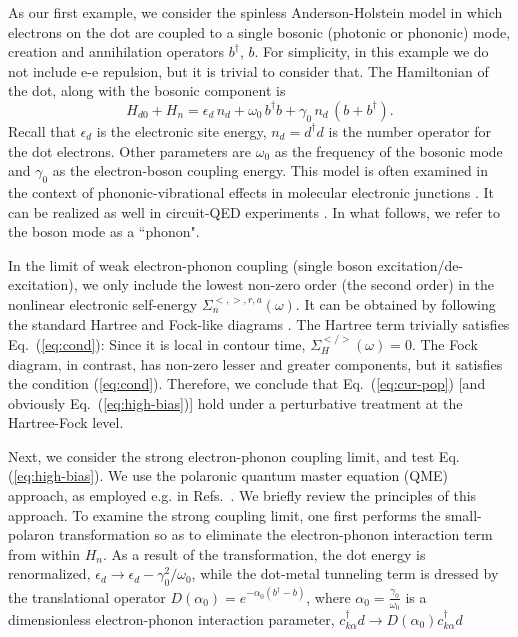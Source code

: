 \documentclass[aps,pra,twocolumn,groupedaddress,showpacs,superscriptaddress,amssymb,amsmath]{revtex4-1}
\newcommand{\be}{\begin{equation}}
\newcommand{\ee}{\end{equation}}
\begin{document}


As our first example, we consider the spinless Anderson-Holstein model \cite{AHcomment}
in which electrons on  the dot are coupled 
to a single bosonic (photonic or phononic) mode, creation and annihilation operators $b^{\dagger}$, $b$.
For simplicity, in this example we do not include e-e repulsion, but it is trivial to consider that. 
The Hamiltonian of the dot, along with the bosonic component is
%
\be
H_{d0}+H_n= \epsilon_d \, n_d + \omega_0 \, b^{\dagger} b+ \gamma_0\, n_d\, (b+b^{\dagger}).
\label{eq:AH}
\ee
%
Recall that $\epsilon_d$ is the electronic site energy, $n_d =d^{\dagger} d$ is the number operator for the dot electrons.
Other parameters are $\omega_0$ as the frequency of the bosonic mode and $\gamma_0$ as the electron-boson coupling energy. 
This model is often examined in the context of phononic-vibrational effects in molecular electronic
junctions \cite{Galperin-review}. It can be realized as well in circuit-QED experiments \cite{Kontos-cQED, LeHur-cQED}.
In what follows, we refer to the boson mode as a ``phonon".

In the limit of weak electron-phonon coupling (single boson excitation/de-excitation), 
we only include the lowest non-zero order (the second order) in the nonlinear electronic self-energy 
 $\Sigma_{n}^{<,>,r,a}(\omega)$.
It can be obtained by following the standard Hartree and Fock-like diagrams \cite{Galperin-review}. 
The Hartree term trivially satisfies Eq.~(\ref{eq:cond}): Since it is local in contour time, 
$\Sigma_{H}^{</>}(\omega)=0$. 
The Fock diagram, in contrast, has non-zero lesser and greater components,  but it satisfies 
the condition (\ref{eq:cond}). Therefore, we conclude that Eq.~(\ref{eq:cur-pop}) [and obviously Eq.~(\ref{eq:high-bias})]
hold under a perturbative treatment at the Hartree-Fock level. 
 
Next, we consider the strong electron-phonon coupling limit, and test Eq. (\ref{eq:high-bias}). We use 
the polaronic quantum master equation (QME) approach, as employed e.g. in
Refs.~\cite{Mitra,KochSela,Koch1,Koch2,Wege,Thoss11a, Thoss11b,Simine,Gernot1,Gernot2}. 
%
We briefly review the principles of this approach.
To examine the strong coupling limit, one first performs the small-polaron transformation so as to eliminate
the electron-phonon interaction term from within $H_n$. As a result of the transformation,
the dot energy is renormalized, $\epsilon_d \to \epsilon_d - \gamma_0^2/\omega_0$, 
while the dot-metal tunneling term is dressed by the translational operator 
$D(\alpha_0)= e^{-\alpha_0 (b^{\dagger}-b)}$, where $\alpha_0=\frac{\gamma_0}{\omega_0}$ is a dimensionless
electron-phonon interaction parameter, $c^{\dagger}_{k\alpha}d \rightarrow D(\alpha_0)c^{\dagger}_{k\alpha}d $
\end{document}
